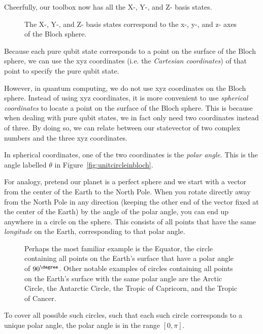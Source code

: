 \documentclass{article}
\theoremstyle{definition}
\begin{document}
Cheerfully, our toolbox now has all the X-, Y-, and Z- basis states.
\begin{figure}[H]
	\caption{The X-, Y-, and Z- basis states correspond to the x-, y-, and z- axes of the Bloch sphere.}
\end{figure}
Because each pure qubit state corresponds to a point on the surface of the Bloch sphere, we can use the xyz coordinates (i.e. the \textit{Cartesian coordinates}) of that point to specify the pure qubit state.

However, in quantum computing, we do not use xyz coordinates on the Bloch sphere.  Instead of using xyz coordinates, it is more convenient to use \textit{spherical coordinates} to locate a point on the surface of the Bloch sphere.  This is because when dealing with pure qubit states, we in fact only need two coordinates instead of three.  By doing so, we can relate between our statevector of two complex numbers and the three xyz coordinates.

In spherical coordinates, one of the two coordinates is the \textit{polar angle}.  This is the angle labelled $\theta$ in Figure~\ref{fig:unitcircleinbloch}.

For analogy, pretend our planet is a perfect sphere and we start with a vector from the center of the Earth to the North Pole.  When you rotate directly away from the North Pole in any direction (keeping the other end of the vector fixed at the center of the Earth) by the angle of the polar angle, you can end up anywhere in a circle on the sphere.  This consists of all points that have the same \textit{longitude} on the Earth, corresponding to that polar angle.
\begin{figure}[H]
	\caption{Perhaps the most familiar example is the Equator, the circle containing all points on the Earth's surface that have a polar angle of $90^{\degree}$.
	Other notable examples of circles containing all points on the Earth's surface with the same polar angle are the Arctic Circle, the Antarctic Circle, the Tropic of Capricorn, and the Tropic of Cancer.}
\end{figure}
To cover all possible such circles, such that each such circle corresponds to a unique polar angle, the polar angle is in the range $[0,\pi]$.
\end{document}
